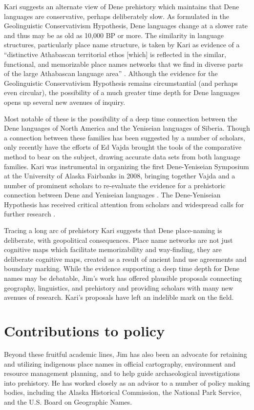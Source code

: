 Kari suggests an alternate view of Dene prehistory which maintains that Dene languages are conservative, perhaps deliberately slow. As formulated in the Geolinguistic Conservativism Hypothesis, Dene languages change at a slower rate and thus may be as old as 10,000 BP or more. The similarity in language structures, particularly place name structure, is taken by Kari as evidence of a ``distinctive Athabascan territorial ethos [which] is reflected in the similar, functional, and memorizable place names networks that we find in diverse parts of the large Athabascan language area'' \citep[207]{kari2010b}. Although the evidence for the Geolinguistic Conservativism Hypothesis remains circumstantial (and perhaps even circular), the possibility of a much greater time depth for Dene languages opens up several new avenues of inquiry.

Most notable of these is the possibility of a deep time connection between the Dene languages of North America and the Yeniseian languages of Siberia. Though a connection between these families has been suggested by a number of scholars, only recently have the efforts of Ed Vajda brought the tools of the comparative method to bear on the subject, drawing accurate data sets from both language families. Kari was instrumental in organizing the first Dene-Yeniseian Symposium at the University of Alaska Fairbanks in 2008, bringing together Vajda and a number of prominent scholars to re-evaluate the evidence for a prehistoric connection between Dene and Yeniseian languages \citep{kari-potter2010}. The Dene-Yeniseian Hypothesis has received critical attention from scholars and widespread calls for further research \citep{diamond2011}.

Tracing a long arc of prehistory Kari suggests that Dene place-naming is deliberate, with geopolitical consequences. Place name networks are not just cognitive maps which facilitate memorizability and way-finding, they are deliberate cognitive maps, created as a result of ancient land use agreements and boundary marking. While the evidence supporting a deep time depth for Dene names may be debatable, Jim's work has offered plausible proposals connecting geography, linguistics, and prehistory and providing scholars with many new avenues of research. Kari's proposals have left an indelible mark on the field.

\section{Contributions to policy}
Beyond these fruitful academic lines, Jim has also been an advocate for retaining and utilizing indigenous place names in official cartography, environment and resource management planning, and to help guide archaeological investigations into prehistory. He has worked closely as an advisor to a number of policy making bodies, including the Alaska Historical Commission, the National Park Service, and the U.S. Board on Geographic Names.

